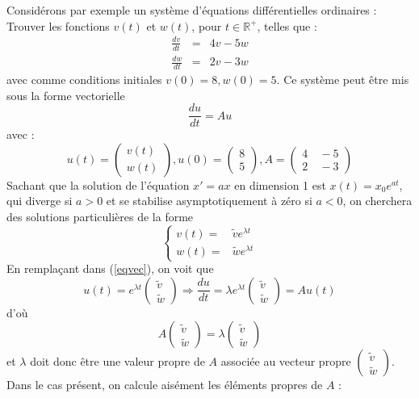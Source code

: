 Considérons par exemple un système d'équations différentielles ordinaires : \\
Trouver les fonctions $v(t)$ et $w(t)$, pour $t\in \mathbb{R}^+$, telles que :
\begin{eqnarray*}
\frac{dv}{dt}& =& 4v - 5w\\[.25pc]
\frac{dw}{dt}& =& 2v - 3w
\end{eqnarray*}
avec comme conditions initiales $v(0)=8,w(0)=5$.
Ce système peut être mis sous la forme vectorielle
\begin{equation}\label{eqvec}
\frac{du}{dt}=Au
\end{equation}
avec : $$u(t)=\begin{pmatrix}v(t)\\w(t)\end {pmatrix},u(0)=\begin{pmatrix}8\\5\end {pmatrix},A=\begin{pmatrix}4\quad -5\\2\quad -3\end {pmatrix}$$
Sachant que la solution de l'équation $x'=ax$ en dimension 1 est $x(t)=x_0e^{at}$, qui diverge si $a>0$ et se stabilise asymptotiquement à zéro si $a<0$, on cherchera des solutions particulières de la forme 
$$
\left \{
\begin{array}{cc}
v(t) =& \tilde{v}e^{\lambda t}\\
w(t) =& \tilde{w}e^{\lambda t}
\end{array}
\right .
$$ 
En remplaçant dans (\ref{eqvec}), on voit que 
$$
u(t)=e^{\lambda t}\begin{pmatrix}
                            \tilde{v}\\ \tilde{w}
                  \end{pmatrix}
    \Rightarrow \frac{du}{dt}=\lambda e^{\lambda t}
                  \begin{pmatrix}
                             \tilde{v}\\ \tilde{w}
                  \end{pmatrix}=Au(t)
$$
d'où 
$$
A\begin{pmatrix}\tilde{v}\\\tilde{w}\end{pmatrix}
=\lambda\begin{pmatrix}\tilde{v}\\\tilde{w}\end{pmatrix}
$$
et $\lambda$ doit donc être une valeur propre de $A$ associée au vecteur propre $\begin{pmatrix}\tilde{v}\\\tilde{w}\end {pmatrix}$. Dans le cas présent, on calcule aisément les éléments propres de $A$ :
